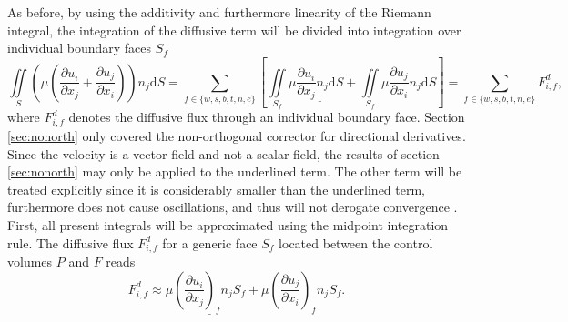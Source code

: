 As before, by using the additivity and furthermore linearity of the Riemann integral, the integration of the diffusive term will be divided into integration over individual boundary faces \(S_f\) 
\begin{displaymath}
  \iint\limits_S \left(\mu \left( \frac{\partial u_i}{\partial x_j} + \frac{\partial u_j}{\partial x_i}\right)\right)n_j \mathrm{d}S 
  = \sum_{f \in \{w,s,b,t,n,e\}} \left[
    \iint\limits_{S_f} \mu \underline{\frac{\partial u_i}{\partial x_j}n_j \mathrm{d}S}
  + \iint\limits_{S_f} \mu \frac{\partial u_j}{\partial x_i}n_j \mathrm{d}S \right]
   = \sum_{f \in \{w,s,b,t,n,e\}} F_{i,f}^{d},
\end{displaymath}
where \(F_{i,f}^{d}\) denotes the diffusive flux through an individual boundary face. Section \ref{sec:nonorth} only covered the non-orthogonal corrector for directional derivatives. Since the velocity is a vector field and not a scalar field, the results of section \ref{sec:nonorth} may only be applied to the underlined term. The other term will be treated explicitly since it is considerably smaller than the underlined term, furthermore does not cause oscillations, and thus will not derogate convergence \cite{ferziger02}. First, all present integrals will be approximated using the midpoint integration rule. The diffusive flux \(F_{i,f}^d\) for a generic face \(S_f\) located between the control volumes \(P\) and \(F\) reads 
\begin{displaymath}
  F_{i,f}^d \approx \mu \underline{\left(\frac{\partial u_i}{\partial x_j}\right)_f n_j S_f} + \mu \left(\frac{\partial u_j}{\partial x_i}\right)_f n_j S_f.
\end{displaymath}

